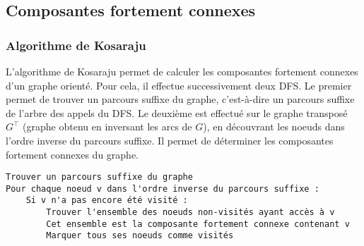 \documentclass[11pt,a4paper]{article}
\begin{document}
  \subsection{Composantes fortement connexes}

    \subsubsection{Algorithme de Kosaraju}
L'algorithme de Kosaraju permet de calculer les composantes fortement connexes d'un graphe orienté. Pour cela, il effectue successivement deux DFS. Le premier permet de trouver un parcours suffixe du graphe, c'est-à-dire un parcours suffixe de l'arbre des appels du DFS. Le deuxième est effectué sur le graphe transposé \(G^\top\) (graphe obtenu en inversant les arcs de \(G\)), en découvrant les noeuds dans l'ordre inverse du parcours suffixe. Il permet de déterminer les composantes fortement connexes du graphe.

\begin{lstlisting}
Trouver un parcours suffixe du graphe
Pour chaque noeud v dans l'ordre inverse du parcours suffixe :
    Si v n'a pas encore été visité :
        Trouver l'ensemble des noeuds non-visités ayant accès à v
        Cet ensemble est la composante fortement connexe contenant v
        Marquer tous ses noeuds comme visités
\end{lstlisting}
\end{document}

